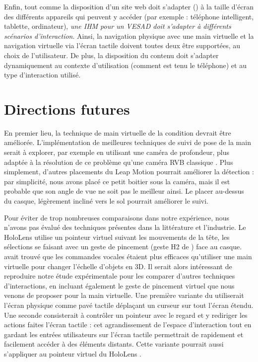 Enfin, tout comme la disposition d'un site web doit s'adapter () à la taille d'écran des différents appareils qui peuvent y accéder (par exemple : téléphone intelligent, tablette, ordinateur), \emph{une IHM pour un VESAD doit s'adapter à différents scénarios d'interaction}. Ainsi, la navigation physique avec une main virtuelle et la navigation virtuelle via l'écran tactile doivent toutes deux être supportées, au choix de l'utilisateur. De plus, la disposition du contenu doit s'adapter dynamiquement au contexte d'utilisation (comment est tenu le téléphone) et au type d'interaction utilisé.


\section{Directions futures}
\label{sec:discussion_future}

En premier lieu, la technique de main virtuelle de la condition  devrait être améliorée. L'implémentation de meilleures techniques de suivi de pose de la main serait à explorer, par exemple en utilisant une caméra de profondeur, plus adaptée à la résolution de ce problème qu'une caméra RVB classique \cite{Taylor2016}. Plus simplement, d'autres placements du Leap Motion pourrait améliorer la détection : par simplicité, nous avons placé ce petit boitier sous la caméra, mais il est probable que son angle de vue ne soit pas le meilleur ainsi. Le placer au-dessus du casque, légèrement incliné vers le sol pourrait améliorer le suivi.

Pour éviter de trop nombreuses comparaisons dans notre expérience, nous n'avons pas évalué des techniques présentes dans la littérature et l'industrie. Le HoloLens utilise un pointeur virtuel suivant les mouvements de la tête, les sélections se faisant avec un geste de pincement (geste H2 de \cite{Piumsomboon2013}) face au casque. \cite{Piumsomboon2014} avait trouvé que les commandes vocales étaient plus efficaces qu'utiliser une main virtuelle pour changer l'échelle d'objets en 3D. Il serait alors intéressant de reproduire notre étude expérimentale pour les comparer d'autres techniques d'interactions, en incluant également le geste de pincement virtuel que nous venons de proposer pour la main virtuelle. Une première variante du  utiliserait l'écran physique comme pavé tactile déplaçant un curseur sur tout l'écran étendu. Une seconde consisterait à contrôler un pointeur avec le regard et y rediriger les actions faites l'écran tactile  : cet agrandissement de l'espace d'interaction tout en gardant les entrées utilisateurs sur l'écran tactile permettrait de rapidement et facilement accéder à des éléments distants. Cette variante pourrait aussi s'appliquer au pointeur virtuel du HoloLens .

